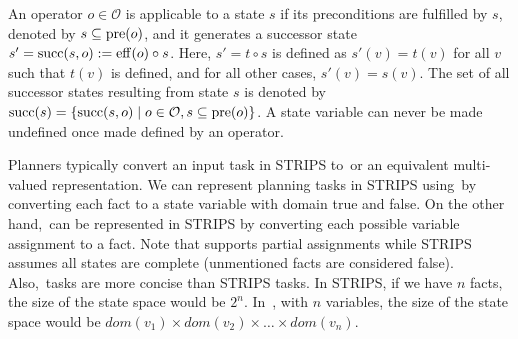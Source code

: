 \documentclass[ppgc,diss,english]{iiufrgs}
\begin{document}
An operator $o \in \mathcal{O}$ is applicable to a state $s$ if its preconditions are fulfilled by $s$, denoted by $s \subseteq \operatorname{pre}(o)$, and it generates a successor state $s'=\operatorname{succ}(s,o):=\operatorname{eff}(o)\circ s$. Here, $s'=t\circ s$ is defined as $s'(v)=t(v)$ for all $v$ such that $t(v)$ is defined, and for all other cases, $s'(v)=s(v)$. The set of all successor states resulting from state $s$ is denoted by $\operatorname{succ}(s)=\{{\operatorname{succ}(s,o)\mid o\in \mathcal{O}, s \subseteq \operatorname{pre}(o)}\}$. A state variable can never be made undefined once made defined by an operator.

Planners typically convert an input task in STRIPS to~\sas or an equivalent multi-valued representation. We can represent planning tasks in STRIPS using~\sas by converting each fact to a state variable with domain true and false. On the other hand,~\sas can be represented in STRIPS by converting each possible variable assignment to a fact. Note that \sas supports partial assignments while STRIPS assumes all states are complete (unmentioned facts are considered false).
Also,~\sas tasks are more concise than STRIPS tasks. In STRIPS, if we have $n$ facts, the size of the state space would be $2^n$. In~\sas,  with $n$ variables, the size of the state space would be $dom(v_{1}) \times dom(v_{2}) \times \ldots \times dom(v_{n})$.

\end{document}
